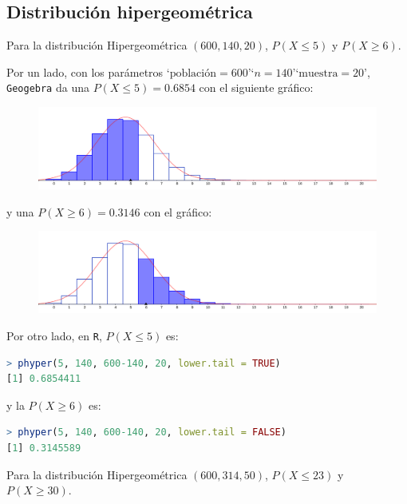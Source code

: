 \subsection{Distribución hipergeométrica}
\begin{ejer}
	Para la distribución Hipergeométrica $(600, 140, 20)$, $P(X \leq 5)$ y $P(X \geq 6)$.
\end{ejer}
\begin{sol}
	Por un lado, con los parámetros `$\text{población} = 600$'\;`$n=140$'\;`$\text{muestra} = 20$', \texttt{Geogebra} da una $P(X\leq 5) = 0.6854$ con el siguiente gráfico:
	 \begin{figure}[H]
	 \includegraphics[width=0.5\linewidth]{pics/g12-1}
	 \centering
	 \end{figure}\noindent
 	y una $P(X\geq 6) = 0.3146$  con el gráfico:
 	\begin{figure}[H]
 	\includegraphics[width=0.5\linewidth]{pics/g12-2}
 	\centering
 	\end{figure}\noindent
 	Por otro lado, en \texttt{R}, $P(X\leq 5)$ es:
 	\begin{lstlisting}[language=R]
> phyper(5, 140, 600-140, 20, lower.tail = TRUE)
[1] 0.6854411
 	\end{lstlisting}
 	y la $P(X\geq 6)$ es:
 	\begin{lstlisting}[language=R]
> phyper(5, 140, 600-140, 20, lower.tail = FALSE)
[1] 0.3145589
 	\end{lstlisting}
\end{sol}
\begin{ejer}
	Para la distribución Hipergeométrica $(600, 314, 50)$, $P(X \leq 23)$ y $P(X \geq 30)$.
\end{ejer}
